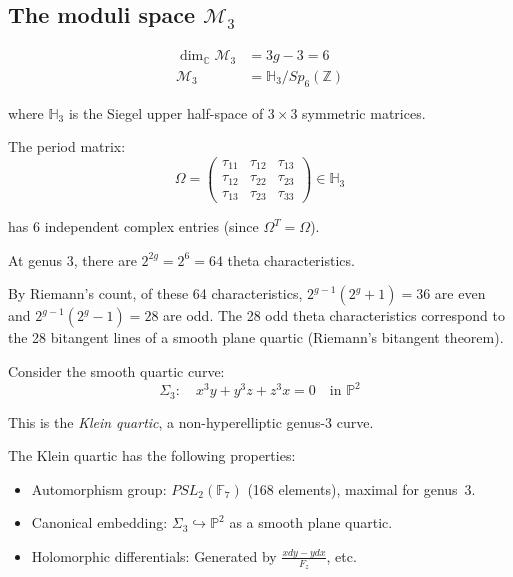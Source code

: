 \subsection{\texorpdfstring{The moduli space $\mathcal{M}_3$}{The moduli space M-3}}

\begin{definition}
\label{def:moduli-g3}
\begin{align}
\dim_{\mathbb{C}} \mathcal{M}_3 &= 3g - 3 = 6 \\
\mathcal{M}_3 &= \mathbb{H}_3 / Sp_6(\mathbb{Z})
\end{align}

where $\mathbb{H}_3$ is the Siegel upper half-space of $3 \times 3$ symmetric matrices.

The period matrix:
\begin{equation}
\Omega = \begin{pmatrix}
\tau_{11} & \tau_{12} & \tau_{13} \\
\tau_{12} & \tau_{22} & \tau_{23} \\
\tau_{13} & \tau_{23} & \tau_{33}
\end{pmatrix} \in \mathbb{H}_3
\end{equation}

has $6$ independent complex entries (since $\Omega^T = \Omega$).
\end{definition}

\begin{theorem}
\label{thm:theta-g3}
At genus 3, there are $2^{2g} = 2^6 = 64$ theta characteristics.

By Riemann's count, of these 64 characteristics, $2^{g-1}(2^g+1) = 36$ are even and $2^{g-1}(2^g-1) = 28$ are odd. The 28 odd theta characteristics correspond to the 28 bitangent lines of a smooth plane quartic (Riemann's bitangent theorem).
\end{theorem}

\begin{example}
\label{ex:klein-quartic-g3}
Consider the smooth quartic curve:
\begin{equation}
\Sigma_3: \quad x^3 y + y^3 z + z^3 x = 0 \quad \text{in } \mathbb{P}^2
\end{equation}

This is the \emph{Klein quartic}, a non-hyperelliptic genus-$3$ curve.

The Klein quartic has the following properties:
\begin{itemize}
\item Automorphism group: $PSL_2(\mathbb{F}_7)$ (168 elements), maximal for genus~$3$.
\item Canonical embedding: $\Sigma_3 \hookrightarrow \mathbb{P}^2$ as a smooth plane quartic.
\item Holomorphic differentials: Generated by $\frac{x dy - y dx}{F_z}$, etc.
\end{itemize}
\end{example}

